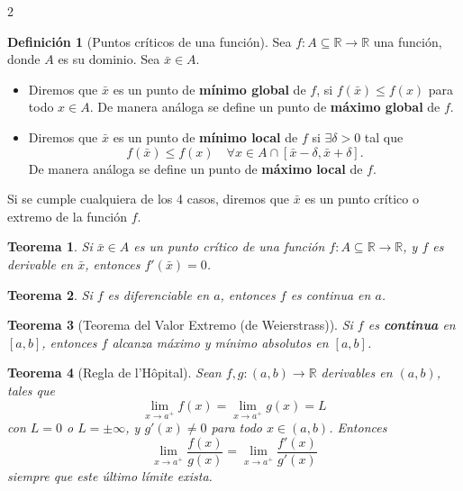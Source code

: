 \documentclass[letterpaper,12pt]{article}
\theoremstyle{plain}
\newtheorem{teo}{Teorema}
\theoremstyle{definition}
\newtheorem{defi}{Definici\'on}
\begin{document}
\begin{tcolorbox}[title = Resumen, colframe=cyan!80!black, colback=cyan!5!white, boxrule=0.8pt, arc=4pt, auto outer arc]

\begin{multicols}{2}

\begin{defi}[Puntos críticos de una función] Sea $f : A \subseteq \mathbb{R} \to \mathbb{R}$ una función, donde $A$ es su dominio. Sea $\bar{x} \in A$.
\begin{itemize}
    \item Diremos que $\bar{x}$ es un punto de \textbf{mínimo global} de $f$, si $f(\bar{x}) \le f(x)$ para todo $x \in A$.
    De manera análoga se define un punto de \textbf{máximo global} de $f$.
    
    \item Diremos que $\bar{x}$ es un punto de \textbf{mínimo local} de $f$ si $\exists \delta > 0$ tal que
    \[
    f(\bar{x}) \le f(x) \quad \forall x \in A \cap [\bar{x} - \delta, \bar{x} + \delta].
    \]
    De manera análoga se define un punto de \textbf{máximo local} de $f$.
\end{itemize}
\end{defi}
Si se cumple cualquiera de los 4 casos, diremos que $\bar{x}$ es un punto crítico o extremo de la función $f$.

\begin{teo}
Si $\bar{x} \in A$ es un punto crítico de una función $f : A \subseteq \mathbb{R} \to \mathbb{R}$, y $f$ es derivable en $\bar{x}$, entonces $f'(\bar{x}) = 0$.
\end{teo}

\begin{teo}
Si $f$ es diferenciable en $a$, entonces $f$ es continua en $a$.
\end{teo}
\begin{teo}[Teorema del Valor Extremo (de Weierstrass)]
Si $f$ es \textbf{continua} en $[a, b]$, entonces $f$ alcanza máximo y mínimo absolutos en $[a, b]$.\end{teo}

\begin{teo}[Regla de l’Hôpital] Sean $f, g : (a, b) \to \mathbb{R}$ derivables en $(a, b)$, tales que
\[
\lim_{x \to a^+} f(x) = \lim_{x \to a^+} g(x) = L
\]
con $L = 0$ o $L = \pm\infty$, y $g'(x) \neq 0$ para todo $x \in (a, b)$. Entonces
\[
\lim_{x \to a^+} \frac{f(x)}{g(x)} = \lim_{x \to a^+} \frac{f'(x)}{g'(x)}
\]
siempre que este último límite exista.
\end{teo}


\end{multicols}
\end{tcolorbox}
\end{document}
